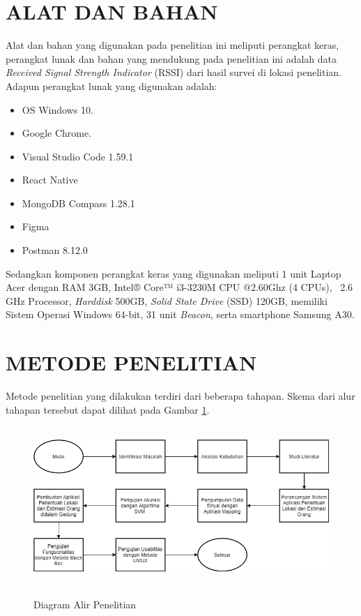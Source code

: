 \section{\uppercase{ALAT DAN BAHAN}}
Alat dan bahan yang digunakan pada penelitian ini meliputi perangkat keras, perangkat lunak dan bahan yang mendukung pada penelitian ini adalah data \textit{Received Signal Strength Indicator} (RSSI) dari hasil survei di lokasi penelitian. Adapun perangkat lunak yang digunakan adalah:
\begin{itemize}
	\itemsep0em
	\item OS Windows 10.
	\item Google Chrome.
	\item Visual Studio Code 1.59.1
	\item React Native
	\item MongoDB Compass 1.28.1
	\item Figma
	\item Postman 8.12.0
\end{itemize}

\par Sedangkan komponen perangkat keras yang digunakan meliputi 1 unit Laptop Acer dengan RAM 3GB, Intel® Core™ i3-3230M CPU @2.60Ghz (4 CPUs), ~2.6 GHz Processor, \textit{Harddisk} 500GB, \textit{Solid State Drive} (SSD) 120GB, memiliki Sistem Operasi Windows 64-bit, 31 unit \textit{Beacon}, serta smartphone Samsung A30.

\section{\uppercase{METODE PENELITIAN}}
Metode penelitian yang dilakukan terdiri dari beberapa tahapan. Skema dari alur tahapan tersebut dapat dilihat pada Gambar \ref{metpen}.
\begin{figure}[H]
	\centering
	{\includegraphics [width = 14cm, height= 6cm]{gambar/metodepenelitian.drawio }}
	\caption{Diagram Alir Penelitian}
	\label{metpen}
\end{figure}

